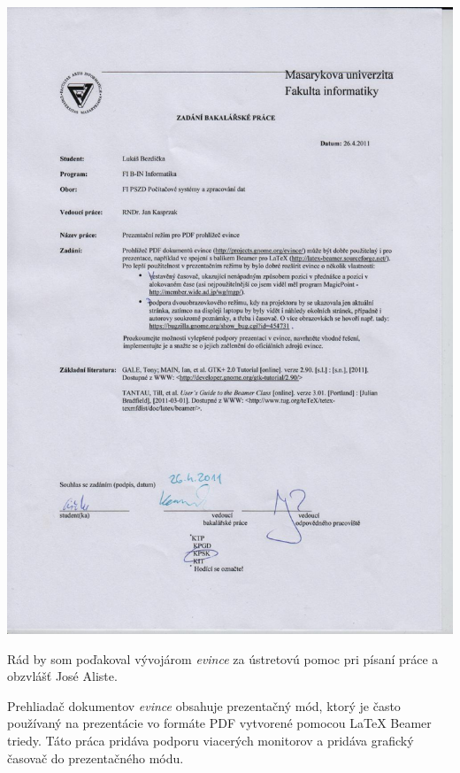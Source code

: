 \documentclass[12pt,oneside,final]{fithesis2}
\begin{document}
\FrontMatter
\ThesisTitlePage

\includegraphics[height=\textheight]{zadani.pdf}


\begin{ThesisDeclaration}
\DeclarationText
\AdvisorName
\end{ThesisDeclaration}

\begin{ThesisThanks}
Rád by som poďakoval vývojárom \emph{evince} za ústretovú pomoc pri písaní práce a obzvlášť José Aliste.
\end{ThesisThanks}  

\begin{ThesisAbstract}
Prehliadač dokumentov \emph{evince} obsahuje prezentačný mód, ktorý je často používaný na prezentácie vo formáte PDF vytvorené pomocou LaTeX Beamer triedy. Táto práca pridáva podporu viacerých monitorov a pridáva grafický časovač do prezentačného módu.
\end{ThesisAbstract}
\end{document}
